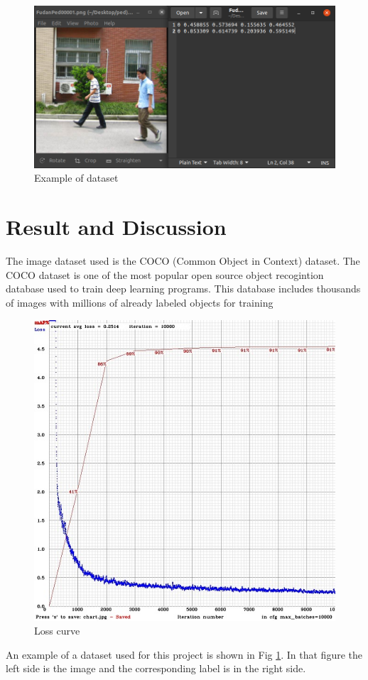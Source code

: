 \documentclass{svproc}
\begin{document}
\begin{figure}[!h]
	\includegraphics[width=\columnwidth]{./images/dataset.png}
	\caption{Example of dataset}
	\label{dataset}
\end{figure}

\section{Result and Discussion}
The image dataset used is the COCO (Common Object in Context) dataset. The COCO dataset is one of the most popular open source object recogintion database used to train deep learning programs. This database includes thousands of images with millions of already labeled objects for training
\begin{figure}[!h]
	\includegraphics[width=\columnwidth]{./images/loss.jpeg}
	\caption{Loss curve}
	\label{loss}
\end{figure}
An example of a dataset used for this project is shown in Fig \ref{dataset}. In that figure the left side is the image and the corresponding label is in the right side. 
\end{document}
